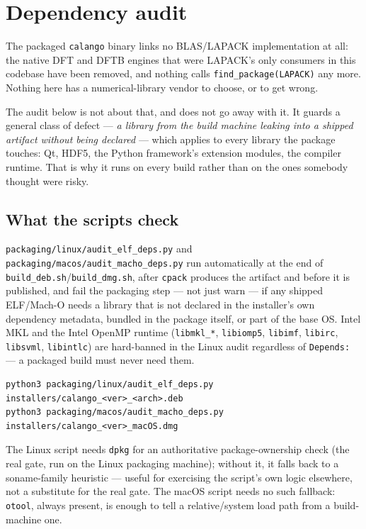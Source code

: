 \documentclass[11pt,a4paper]{article}
\newcommand{\file}[1]{\texttt{#1}}
\newcommand{\opt}[1]{\texttt{#1}}
\begin{document}
\section{Dependency audit}
\label{sec:dep-audit}

The packaged \file{calango} binary links no BLAS/LAPACK implementation at
all: the native DFT and DFTB engines that were LAPACK's only consumers in
this codebase have been removed, and nothing calls
\opt{find\_package(LAPACK)} any more. Nothing here has a numerical-library
vendor to choose, or to get wrong.

The audit below is not about that, and does not go away with it. It guards
a general class of defect --- \emph{a library from the build machine
leaking into a shipped artifact without being declared} --- which applies
to every library the package touches: Qt, HDF5, the Python framework's
extension modules, the compiler runtime. That is why it runs on every
build rather than on the ones somebody thought were risky.

\subsection{What the scripts check}

\file{packaging/linux/audit\_elf\_deps.py} and
\file{packaging/macos/audit\_macho\_deps.py} run automatically at the end
of \file{build\_deb.sh}/\file{build\_dmg.sh}, after \opt{cpack} produces
the artifact and before it is published, and fail the packaging step ---
not just warn --- if any shipped ELF/Mach-O needs a library that is not
declared in the installer's own dependency metadata, bundled in the
package itself, or part of the base OS. Intel MKL and the Intel OpenMP
runtime (\file{libmkl\_*}, \file{libiomp5}, \file{libimf}, \file{libirc},
\file{libsvml}, \file{libintlc}) are hard-banned in the Linux audit
regardless of \texttt{Depends:} --- a packaged build must never need them.

\begin{lstlisting}
python3 packaging/linux/audit_elf_deps.py installers/calango_<ver>_<arch>.deb
python3 packaging/macos/audit_macho_deps.py installers/calango_<ver>_macOS.dmg
\end{lstlisting}

The Linux script needs \opt{dpkg} for an authoritative
package-ownership check (the real gate, run on the Linux packaging
machine); without it, it falls back to a soname-family heuristic ---
useful for exercising the script's own logic elsewhere, not a substitute
for the real gate. The macOS script needs no such fallback: \opt{otool},
always present, is enough to tell a relative/system load path from a
build-machine one.
\end{document}
